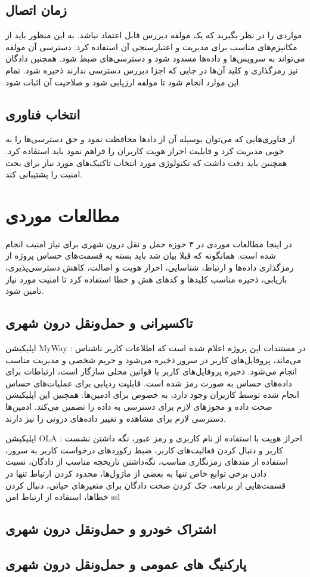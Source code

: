 \subsection{زمان اتصال}
مواردی را در نظر بگیرید که یک مولفه دیررس قابل اعتماد نباشد. 
به این منظور باید از مکانیزم‌های مناسب برای مدیریت و اعتبارسنجی آن‌ استفاده کرد. دسترسی آن مولفه می‌تواند به سرویس‌ها و داده‌ها مسدود شود و دسترسی‌های ضبط شود. همچنین دادگان نیز رمزگذاری و کلید آن‌ها در جایی که اجزا دیررس دسترسی ندارند ذخیره شود. تمام این موارد انجام شود تا مولفه ارزیابی شود و صلاحیت آن اثبات شود.

\subsection{انتخاب فناوری}
از فناوری‌هایی که می‌توان بوسیله آن از داد‌ها محافظت نمود و حق دسترسی‌ها را به خوبی مدیریت کرد و قابلیت احراز هویت کاربران را فراهم نمود باید استفاده کرد.
همچنین باید دقت داشت که تکنولوژی مورد انتخاب تاکتیک‌های مورد نیاز برای بحث امنیت را پشتیبانی کند.




\section{مطالعات موردی}

در اینجا مطالعات موردی در ۳ حوزه حمل و نقل درون شهری برای نیاز امنیت انجام شده است.
همانگونه که قبلا بیان شد باید بسته یه قسمت‌های حساس پروژه از رمزگذاری داد‌ه‌ها و ارتباط، شناسایی، احراز هویت و اصالت، کاهش دسترسی‌پذیری، بازیابی، ذخیره مناسب کلید‌ها و کدهای هش و خطا استفاده کرد تا امنیت مورد نیاز تامین شود.
 
\subsection{تاکسیرانی و حمل‌و‌نقل درون شهری}

اپلیکیشن MyWay :  در مستندات این پروژه اعلام شده است که اطلاعات کاربر ناشناس می‌ماند، پروفایل‌های کاربر در سرور ذخیره می‌شود و حریم شخصی و مدیریت مناسب انجام می‌شود. ذخیره پروفایل‌های کاربر با قوانین محلی سازگار است، ارتباطات برای داده‌های حساس به صورت رمز شده است.  قابلیت ردیابی برای عملیات‌های حساس انجام شده توسط کاربران وجود دارد، به خصوص برای ادمین‌ها. همچنین این اپلیکیشن صحت داده و مجوز‌های لازم برای دسترسی به داده را تضمین می‌کند. ادمین‌ها دسترسی لازم برای مشاهده و تغییر داده‌های درونی را نیز دارند.

اپلیکیشن OLA : احراز هویت با استفاده از نام کاربری و رمز عبور، نگه داشتن نشست کاربر و دنبال کردن فعالیت‌های کاربر، ضبط رکوردهای درخواست کاربر به سرور، استفاده از متد‌های رمزنگاری مناسب، نگه‌داشتن تاریخچه مناسب از دادگان، نسبت دادن برخی توابع خاص تنها به بعضی از ماژول‌ها، محدود کردن ارتباط تنها در قسمت‌هایی از برنامه،‌ چک کردن صحت دادگان برای متغیرهای حیاتی، دنبال کردن خطاها، استفاده از ارتباط امن ssl

\subsection{اشتراک خودرو و حمل‌و‌نقل درون شهری}


\subsection{پارکنیگ های عمومی و حمل‌و‌نقل درون شهری}


